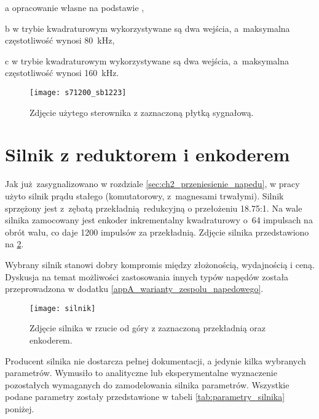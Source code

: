 \begin{table}[H]
\begin{threeparttable}
        \begin{tablenotes}
            \footnotesize
            \item[a] opracowanie własne na podstawie \cite{S7MANUAL},
            \item[b] w trybie kwadraturowym wykorzystywane są dwa wejścia, a~maksymalna częstotliwość wynosi \SI{80}{kHz},
            \item[c] w trybie kwadraturowym wykorzystywane są dwa wejścia, a~maksymalna częstotliwość wynosi \SI{160}{kHz}.
        \end{tablenotes}
    \end{threeparttable}
\end{table}

\begin{figure}[h]
    \centering
    \texttt{[image: s71200\_sb1223]}
    \caption{Zdjęcie użytego sterownika z zaznaczoną płytką sygnałową.}
    \label{fig:sterownik_plytka_sygn}
\end{figure}

\section{Silnik z reduktorem i enkoderem}
\label{sec:ch3_uklad_napedowy}

Jak już zasygnalizowano w rozdziale \ref{sec:ch2_przeniesienie_napedu}, w pracy użyto silnik prądu stałego (komutatorowy, z~magnesami trwałymi). Silnik sprzężony jest z~zębatą przekładnią redukcyjną o przełożeniu \num{18,75}:\num{1}. Na wale silnika zamocowany jest enkoder inkrementalny kwadraturowy o~64 impulsach na obrót wału, co daje 1200 impulsów za przekładnią. Zdjęcie silnika przedstawiono na \cref{fig:silnik}.

Wybrany silnik stanowi dobry kompromis między złożonością, wydajnością i ceną. Dyskusja na temat możliwości zastosowania innych typów napędów została przeprowadzona w dodatku \ref{appA_warianty_zespolu_napedowego}.

\begin{figure}[h]
    \centering
    \texttt{[image: silnik]}
    \caption{Zdjęcie silnika w rzucie od góry z zaznaczoną przekładnią oraz enkoderem.}
    \label{fig:silnik}
\end{figure}

Producent silnika nie dostarcza pełnej dokumentacji, a jedynie kilka wybranych parametrów. Wymusiło to analityczne lub eksperymentalne wyznaczenie pozostałych wymaganych do zamodelowania silnika parametrów. Wszystkie podane parametry zostały przedstawione w tabeli \ref{tab:parametry_silnika} poniżej.


